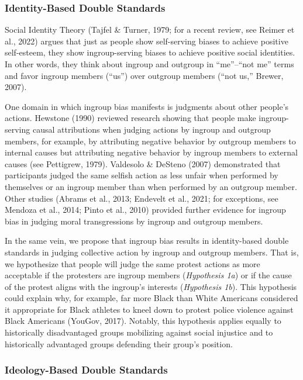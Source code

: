 \documentclass[12pt, letterpaper]{article}
\begin{document}
\hypertarget{identity-based-double-standards}{%
\subsubsection{Identity-Based Double
Standards}\label{identity-based-double-standards}}

Social Identity Theory (Tajfel \& Turner, 1979; for a recent review, see
Reimer et al., 2022) argues that just as people show self-serving biases
to achieve positive self-esteem, they show ingroup-serving biases to
achieve positive social identities. In other words, they think about
ingroup and outgroup in ``me''--``not me'' terms and favor ingroup
members (``us'') over outgroup members (``not us,'' Brewer, 2007).

One domain in which ingroup bias manifests is judgments about other
people's actions. Hewstone (1990) reviewed research showing that people
make ingroup-serving causal attributions when judging actions by ingroup
and outgroup members, for example, by attributing negative behavior by
outgroup members to internal causes but attributing negative behavior by
ingroup members to external causes (see Pettigrew, 1979). Valdesolo \&
DeSteno (2007) demonstrated that participants judged the same selfish
action as less unfair when performed by themselves or an ingroup member
than when performed by an outgroup member. Other studies (Abrams et al.,
2013; Endevelt et al., 2021; for exceptions, see Mendoza et al., 2014;
Pinto et al., 2010) provided further evidence for ingroup bias in
judging moral transgressions by ingroup and outgroup members.

In the same vein, we propose that ingroup bias results in identity-based
double standards in judging collective action by ingroup and outgroup
members. That is, we hypothesize that people will judge the same protest
actions as more acceptable if the protesters are ingroup members
(\emph{Hypothesis 1a}) or if the cause of the protest aligns with the
ingroup's interests (\emph{Hypothesis 1b}). This hypothesis could
explain why, for example, far more Black than White Americans considered
it appropriate for Black athletes to kneel down to protest police
violence against Black Americans (YouGov, 2017). Notably, this
hypothesis applies equally to historically disadvantaged groups
mobilizing against social injustice and to historically advantaged
groups defending their group's position.

\hypertarget{ideology-based-double-standards}{%
\subsubsection{Ideology-Based Double
Standards}\label{ideology-based-double-standards}}
\end{document}

